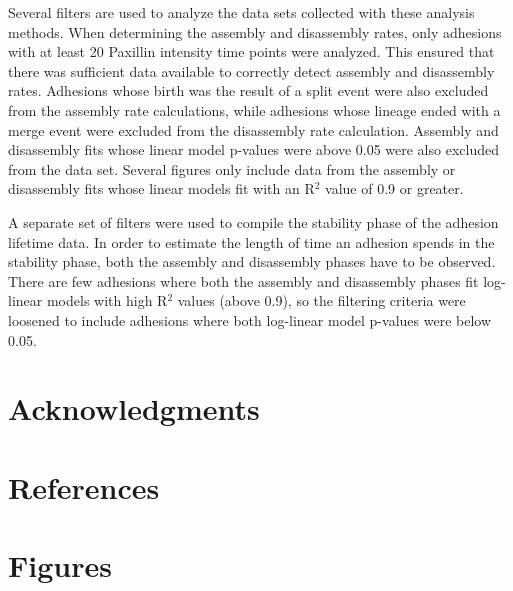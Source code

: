 \documentclass[10pt,draft]{article}
\begin{document}
Several filters are used to analyze the data sets collected with these analysis methods. When determining the assembly and disassembly rates, only adhesions with at least 20 Paxillin intensity time points were analyzed. This ensured that there was sufficient data available to correctly detect assembly and disassembly rates. Adhesions whose birth was the result of a split event were also excluded from the assembly rate calculations, while adhesions whose lineage ended with a merge event were excluded from the disassembly rate calculation. Assembly and disassembly fits whose linear model p-values were above 0.05 were also excluded from the data set. Several figures only include data from the assembly or disassembly fits whose linear models fit with an R$^2$ value of 0.9 or greater.

A separate set of filters were used to compile the stability phase of the adhesion lifetime data. In order to estimate the length of time an adhesion spends in the stability phase, both the assembly and disassembly phases have to be observed. There are few adhesions where both the assembly and disassembly phases fit log-linear models with high R$^2$ values (above 0.9), so the filtering criteria were loosened to include adhesions where both log-linear model p-values were below 0.05.

\section*{Acknowledgments}

\section*{References}


\section*{Figures}
\end{document}

